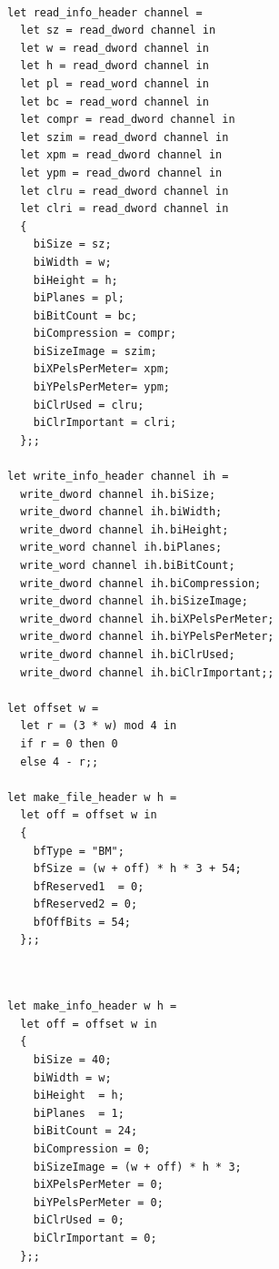 \documentclass[a4paper,10pt]{report}
\theoremstyle{break}
\begin{document}
\newpage
    \begin{lstlisting}

let read_info_header channel =
  let sz = read_dword channel in
  let w = read_dword channel in
  let h = read_dword channel in
  let pl = read_word channel in
  let bc = read_word channel in
  let compr = read_dword channel in
  let szim = read_dword channel in
  let xpm = read_dword channel in
  let ypm = read_dword channel in
  let clru = read_dword channel in
  let clri = read_dword channel in
  {
    biSize = sz;
    biWidth = w;
    biHeight = h;
    biPlanes = pl;
    biBitCount = bc;
    biCompression = compr;
    biSizeImage = szim;
    biXPelsPerMeter= xpm;
    biYPelsPerMeter= ypm;
    biClrUsed = clru;
    biClrImportant = clri;
  };;
  
let write_info_header channel ih =
  write_dword channel ih.biSize;
  write_dword channel ih.biWidth;
  write_dword channel ih.biHeight;
  write_word channel ih.biPlanes;
  write_word channel ih.biBitCount;
  write_dword channel ih.biCompression;
  write_dword channel ih.biSizeImage;
  write_dword channel ih.biXPelsPerMeter;
  write_dword channel ih.biYPelsPerMeter;
  write_dword channel ih.biClrUsed;
  write_dword channel ih.biClrImportant;;

let offset w =
  let r = (3 * w) mod 4 in
  if r = 0 then 0
  else 4 - r;;

let make_file_header w h = 
  let off = offset w in
  {
    bfType = "BM";
    bfSize = (w + off) * h * 3 + 54;
    bfReserved1  = 0;
    bfReserved2 = 0;
    bfOffBits = 54;
  };;
	
    \end{lstlisting}
\newpage
    \begin{lstlisting}
  
let make_info_header w h = 
  let off = offset w in
  {
    biSize = 40;
    biWidth = w;
    biHeight  = h;
    biPlanes  = 1;
    biBitCount = 24;
    biCompression = 0;
    biSizeImage = (w + off) * h * 3;
    biXPelsPerMeter = 0;
    biYPelsPerMeter = 0;
    biClrUsed = 0;
    biClrImportant = 0;
  };;
    \end{lstlisting}
\end{document}

